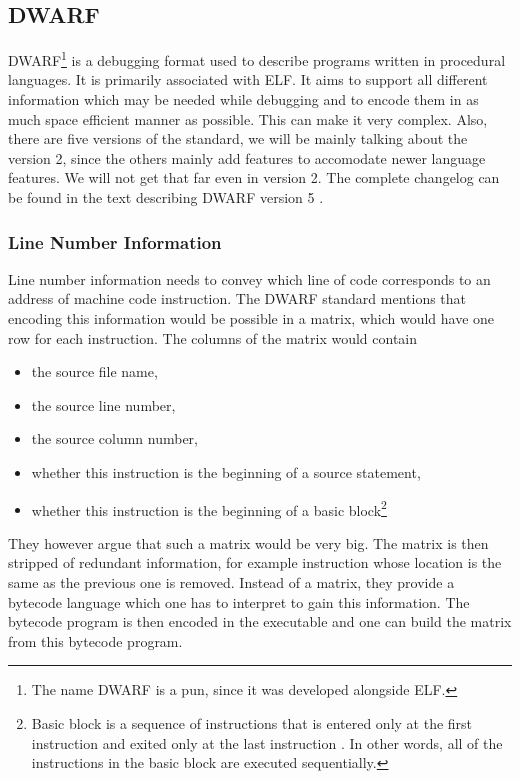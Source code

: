 \subsection{DWARF}
DWARF\footnote{The name DWARF is a pun, since it was developed alongside ELF.}
is a debugging format used to describe programs written in procedural
languages. It is primarily associated with ELF. It aims to support all
different information which may be needed while debugging and to encode them in
as much space efficient manner as possible. This can make it very complex.
Also, there are five versions of the standard, we will be mainly talking about
the version 2, since the others mainly add features to accomodate newer
language features. We will not get that far even in version 2. The complete
changelog can be found in the text describing DWARF version 5 \cite{dwarf-5}.

\subsubsection{Line Number Information}
Line number information needs to convey which line of code corresponds to an
address of machine code instruction. The DWARF standard \cite{dwarf} mentions
that encoding this information would be possible in a matrix, which would have
one row for each instruction. The columns of the matrix would contain
\begin{itemize}
    \item the source file name,
    \item the source line number,
    \item the source column number,
    \item whether this instruction is the beginning of a source statement,
    \item whether this instruction is the beginning of a basic
        block\footnote{Basic block is a sequence of instructions that is
        entered only at the first instruction and exited only at the last
        instruction \cite{dwarf}. In other words, all of the instructions in
        the basic block are executed sequentially.}
\end{itemize}
They however argue that such a matrix would be very big. The matrix is then
stripped of redundant information, for example instruction whose location is
the same as the previous one is removed. Instead of a matrix, they provide a
bytecode language which one has to interpret to gain this information. The
bytecode program is then encoded in the executable and one can build the 
matrix from this bytecode program.

